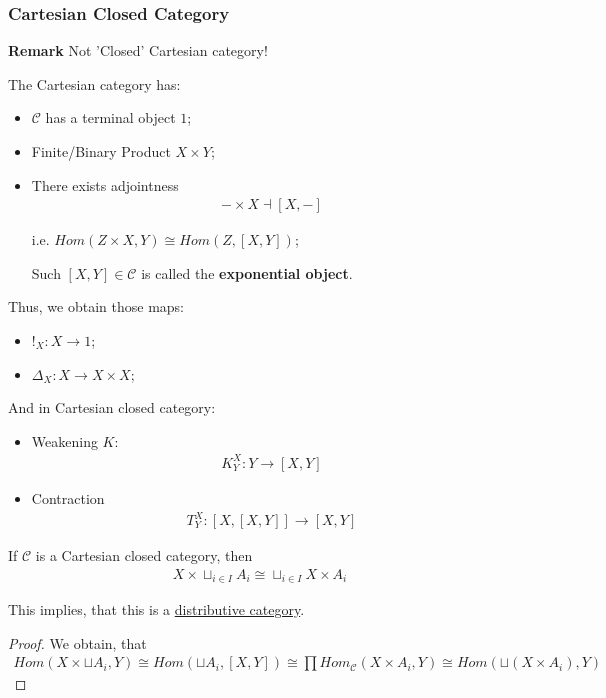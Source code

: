 \documentclass[Total.tex]{subfiles}
\begin{document}
				\subsubsection{Cartesian Closed Category}
				
				\textbf{Remark} Not 'Closed' Cartesian category!
			
				
				\begin{Def}
					The Cartesian category has:
					\begin{itemize}
						\item $\mathcal{C}$ has a terminal object $1$;
						\item Finite/Binary Product $X\times Y$;
						\item There exists adjointness
						\begin{gather*}
							-\times X\dashv [X,-]
						\end{gather*}
						
						i.e. $Hom(Z\times X,Y)\cong Hom(Z,[X,Y])$;
						
						Such $[X,Y]\in \mathcal{C}$ is called the \textbf{exponential object}.
					\end{itemize}
					
					Thus, we obtain those maps:
					\begin{itemize}
						\item $!_X:X\rightarrow 1$;
						\item $\Delta_X:X\rightarrow X\times X$;
					\end{itemize}
					
					And in Cartesian closed category:
					\begin{itemize}
						\item Weakening $K$:
						\begin{gather*}
							K^X_Y:Y\rightarrow [X,Y]
						\end{gather*}
						
						\item Contraction 
						\begin{gather*}
							T^X_Y:[X,[X,Y]]\rightarrow [X,Y]
						\end{gather*}
					\end{itemize}
				\end{Def}
				
				\begin{proposition}
					If $\mathcal{C}$ is a Cartesian closed category, then 
					\begin{gather*}
						X\times \sqcup_{i\in I} A_i\cong \sqcup_{i\in I} X\times A_i
					\end{gather*}
					
					This implies, that this is a \underline{distributive category}.
				\end{proposition}
				\begin{proof}
					We obtain, that
					\begin{gather*}
						Hom(X\times \sqcup A_i,Y)\cong Hom(\sqcup A_i,[X,Y])\cong \prod Hom_\mathcal{C}(X\times A_i,Y)\cong Hom(\sqcup (X\times A_i),Y)
					\end{gather*}
				\end{proof}
				
\end{document}
